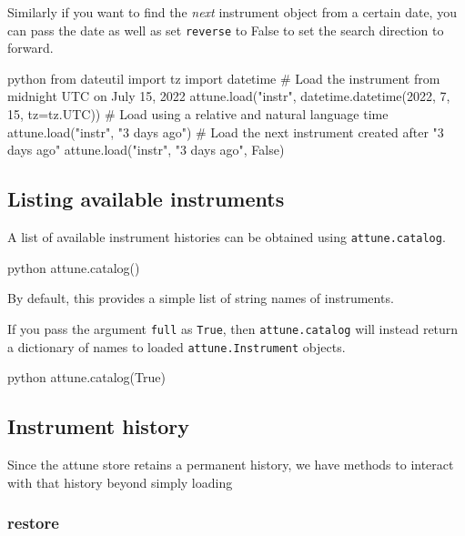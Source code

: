 Similarly if you want to find the \emph{next} instrument object from a
certain date, you can pass the date as well as set \texttt{reverse} to
False to set the search direction to forward.

\begin{codefragment}{python}
from dateutil import tz
import datetime
# Load the instrument from midnight UTC on July 15, 2022
attune.load("instr", datetime.datetime(2022, 7, 15, tz=tz.UTC))
# Load using a relative and natural language time
attune.load("instr", "3 days ago")
# Load the next instrument created after "3 days ago"
attune.load("instr", "3 days ago", False)
\end{codefragment}

\hypertarget{listing-available-instruments}{%
\subsection{Listing available
instruments}\label{listing-available-instruments}}

A list of available instrument histories can be obtained using
\texttt{attune.catalog}.

\begin{codefragment}{python}
attune.catalog()
\end{codefragment}

By default, this provides a simple list of string names of instruments.

If you pass the argument \texttt{full} as \texttt{True}, then
\texttt{attune.catalog} will instead return a dictionary of names to
loaded \texttt{attune.Instrument} objects.

\begin{codefragment}{python}
attune.catalog(True)
\end{codefragment}

\hypertarget{instrument-history}{%
\subsection{Instrument history}\label{instrument-history}}

Since the attune store retains a permanent history, we have methods to
interact with that history beyond simply loading

\hypertarget{restore}{%
\subsubsection{restore}\label{restore}}

